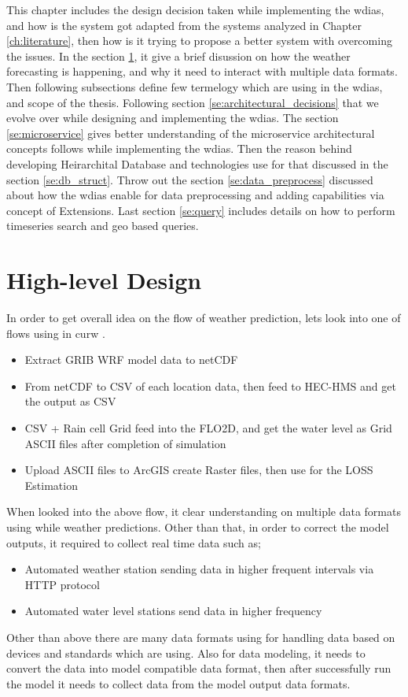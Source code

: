 This chapter includes the design decision taken while implementing the \acrfull{wdias}, and how is the system got adapted from the systems analyzed in Chapter \ref{ch:literature}, then how is it trying to propose a better system with overcoming the issues.
In the section \ref{se:high_level_design}, it give a brief disussion on how the weather forecasting is happening, and why it need to interact with multiple data formats.
Then following subsections define few termelogy which are using in the \acrshort{wdias}, and scope of the thesis.
Following section \ref{se:architectural_decisions} that we evolve over while designing and implementing the \acrshort{wdias}.
The section \ref{se:microservice} gives better understanding of the microservice architectural concepts follows while implementing the \acrshort{wdias}.
Then the reason behind developing Heirarchital Database and technologies use for that discussed in the section \ref{se:db_struct}.
Throw out the section \ref{se:data_preprocess} discussed about how the \acrshort{wdias} enable for data preprocessing and adding capabilities via concept of Extensions.
Last section \ref{se:query} includes details on how to perform timeseries search and geo based queries.

\section{High-level Design}
\label{se:high_level_design}

In order to get overall idea on the flow of weather prediction, lets look into one of flows using in \acrshort{curw} \cite{CUrWSL2017SL}.
\begin{itemize}
    \item Extract GRIB WRF model data to netCDF
    \item From netCDF to CSV of each location data, then feed to HEC-HMS and get the output as CSV
    \item CSV + Rain cell Grid feed into the FLO2D, and get the water level as Grid ASCII files after completion of simulation
    \item Upload ASCII files to ArcGIS create Raster files, then use for the LOSS Estimation
\end{itemize}
When looked into the above flow, it clear understanding on multiple data formats using while weather predictions.
Other than that, in order to correct the model outputs, it required to collect real time data such as;
\begin{itemize}
    \item Automated weather station sending data in higher frequent intervals via HTTP protocol
    \item Automated water level stations send data in higher frequency
\end{itemize}
Other than above there are many data formats using for handling data based on devices and standards which are using. Also for data modeling, it needs to convert the data into model compatible data format, then after successfully run the model it needs to collect data from the model output data formats.

